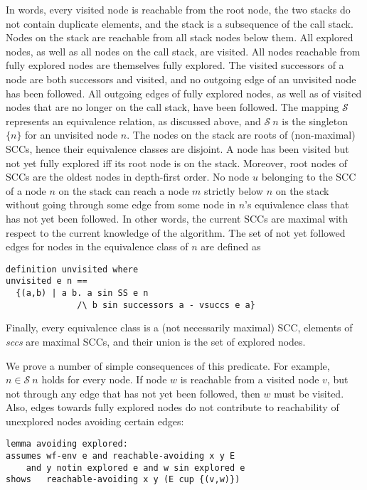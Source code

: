 \documentclass[sigplan,10pt,anonymous,review]{acmart}
\newcommand{\prog}[1]{\textit{#1}}
\renewcommand{\SS}{\mathcal{S}}
\begin{document}
In words, every visited node is reachable from the root node, the two stacks do not contain duplicate elements, and the stack is a subsequence of the call stack. Nodes on the stack are reachable from all stack nodes below them. All explored nodes, as well as all nodes on the call stack, are visited. All nodes reachable from fully explored nodes are themselves fully explored. The visited successors of a node are both successors and visited, and no outgoing edge of an unvisited node has been followed. All outgoing edges of fully explored nodes, as well as of visited nodes that are no longer on the call stack, have been followed. The mapping $\SS$ represents an equivalence relation, as discussed above, and $\SS~n$ is the singleton $\{n\}$ for an unvisited node $n$. The nodes on the stack are roots of (non-maximal) SCCs, hence their equivalence classes are disjoint. A node has been visited but not yet fully explored iff its root node is on the stack. Moreover, root nodes of SCCs are the oldest nodes in depth-first order. No node $u$ belonging to the SCC of a node $n$ on the stack can reach a node $m$ strictly below $n$ on the stack without going through some edge from some node in $n$'s equivalence class that has not yet been followed. In other words, the current SCCs are maximal with respect to the current knowledge of the algorithm. The set of not yet followed edges for nodes in the equivalence class of $n$ are defined as
%
\begin{small}
\begin{lstlisting}[language=isabelle]
definition unvisited where
unvisited e n ==
  {(a,b) | a b. a sin SS e n 
              /\ b sin successors a - vsuccs e a}
\end{lstlisting}
\end{small}
%
Finally, every equivalence class is a (not necessarily maximal) SCC, elements of \prog{sccs} are maximal SCCs, and their union is the set of explored nodes.

We prove a number of simple consequences of this predicate. For example, $n \in \SS~n$ holds for every node. If node $w$ is reachable from a visited node $v$, but not through any edge that has not yet been followed, then $w$ must be visited. Also, edges towards fully explored nodes do not contribute to reachability of unexplored nodes avoiding certain edges:
%
\begin{small}
\begin{lstlisting}[language=isabelle]
lemma avoiding explored:
assumes wf-env e and reachable-avoiding x y E
    and y notin explored e and w sin explored e
shows   reachable-avoiding x y (E cup {(v,w)})
\end{lstlisting}
\end{small}
\end{document}
